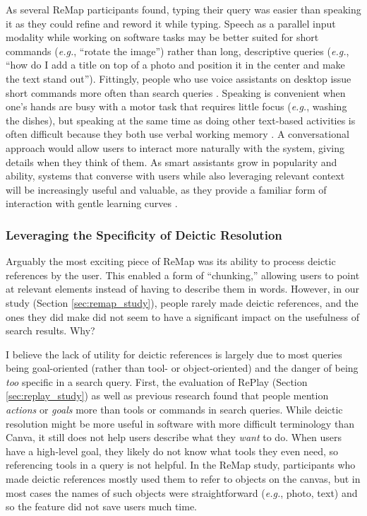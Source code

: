 As several ReMap participants found, typing their query was easier than speaking it as they could refine and reword it while typing. Speech as a parallel input modality while working on software tasks may be better suited for short commands (\textit{e.g.}, ``rotate the image'') rather than long, descriptive queries (\textit{e.g.}, ``how do I add a title on top of a photo and position it in the center and make the text stand out''). Fittingly, people who use voice assistants on desktop issue short commands more often than search queries \cite{Mehrotra2016}. Speaking is convenient when one's hands are busy with a motor task that requires little focus (\textit{e.g.}, washing the dishes), but speaking at the same time as doing other text-based activities is often difficult because they both use verbal working memory \cite{Shneiderman2000a, Begel2006}. A conversational approach would allow users to interact more naturally with the system, giving details when they think of them. As smart assistants grow in popularity and ability, systems that converse with users while also leveraging relevant context will be increasingly useful and valuable, as they provide a familiar form of interaction with gentle learning curves \cite{Klopfenstein2017}.

\subsubsection{Leveraging the Specificity of Deictic Resolution}
Arguably the most exciting piece of ReMap was its ability to process deictic references by the user. This enabled a form of ``chunking,'' \cite{Buxton1986} allowing users to point at relevant elements instead of having to describe them in words. However, in our study (Section \ref{sec:remap_study}), people rarely made deictic references, and the ones they did make did not seem to have a significant impact on the usefulness of search results. Why?

I believe the lack of utility for deictic references is largely due to most queries being goal-oriented (rather than tool- or object-oriented) and the danger of being \textit{too} specific in a search query. First, the evaluation of RePlay (Section \ref{sec:replay_study}) as well as previous research \cite{Bota2018} found that people mention \textit{actions} or \textit{goals} more than tools or commands in search queries. While deictic resolution might be more useful in software with more difficult terminology than Canva, it still does not help users describe what they \textit{want} to do. When users have a high-level goal, they likely do not know what tools they even need, so referencing tools in a query is not helpful. In the ReMap study, participants who made deictic references mostly used them to refer to objects on the canvas, but in most cases the names of such objects were straightforward (\textit{e.g.}, photo, text) and so the feature did not save users much time.

